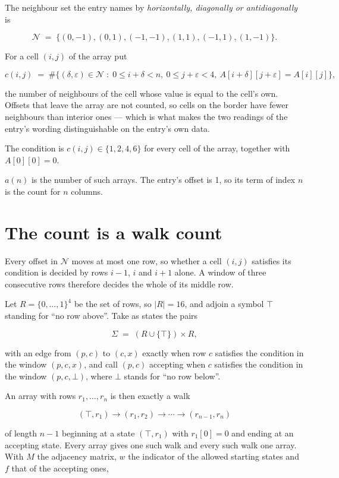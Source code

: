\documentclass[11pt]{article}
\theoremstyle{definition}
\begin{document}
The neighbour set the entry names by {\itshape horizontally, diagonally or antidiagonally} is

\[\mathcal{N} \;=\; \{(0,-1), (0,1), (-1,-1), (1,1), (-1,1), (1,-1)\}.\]

For a cell $(i,j)$ of the array put

\[c(i,j) \;=\; \#\bigl\{(\delta,\varepsilon)\in\mathcal{N} \;:\; 0\le i+\delta<n,\ 0\le j+\varepsilon<4,\ A[i+\delta][j+\varepsilon] = A[i][j]\bigr\},\]

the number of neighbours of the cell whose value is equal to the cell's own. Offsets that leave the array are not counted, so cells on the border have fewer neighbours than interior ones --- which is what makes the two readings of the entry's wording distinguishable on the entry's own data.

The condition is $c(i,j) \in \{1, 2, 4, 6\}$ for every cell of the array, together with $A[0][0]=0$.

$a(n)$ is the number of such arrays. The entry's offset is 1, so its term of index $n$ is the count for $n$ columns.

\section{The count is a walk count}

Every offset in $\mathcal{N}$ moves at most one row, so whether a cell $(i,j)$ satisfies its condition is decided by rows $i-1$, $i$ and $i+1$ alone. A window of three consecutive rows therefore decides the whole of its middle row.

Let $R = \{0,\dots,1\}^{4}$ be the set of rows, so $|R| = 16$, and adjoin a symbol $\top$ standing for ``no row above''. Take as states the pairs

\[\Sigma \;=\; (R \cup \{\top\}) \times R,\]

with an edge from $(p,c)$ to $(c,x)$ exactly when row $c$ satisfies the condition in the window $(p,c,x)$, and call $(p,c)$ accepting when $c$ satisfies the condition in the window $(p,c,\bot)$, where $\bot$ stands for ``no row below''.

An array with rows $r_1,\dots,r_n$ is then exactly a walk

\[(\top,r_1) \to (r_1,r_2) \to \cdots \to (r_{n-1},r_n)\]

of length $n-1$ beginning at a state $(\top,r_1)$ with $r_1[0]=0$ and ending at an accepting state. Every array gives one such walk and every such walk one array. With $M$ the adjacency matrix, $w$ the indicator of the allowed starting states and $f$ that of the accepting ones,
\end{document}
